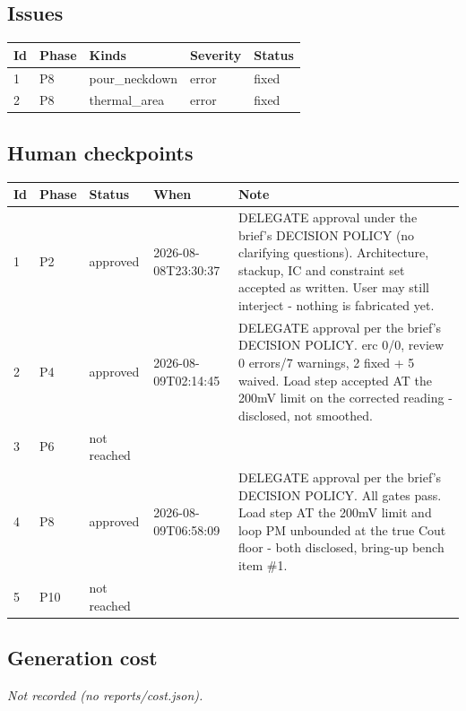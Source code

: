\documentclass[11pt,a4paper]{article}
\begin{document}
\subsection*{Issues}
{\small
\begin{longtable}{llp{5cm}ll}
\toprule
\textbf{Id} & \textbf{Phase} & \textbf{Kinds} & \textbf{Severity} & \textbf{Status} \\
\midrule
\endhead
1 & P8 & pour\_neckdown & error & fixed \\
2 & P8 & thermal\_area & error & fixed \\
\bottomrule
\end{longtable}
}
\subsection*{Human checkpoints}
{\small
\begin{longtable}{lllp{2.6cm}p{6.4cm}}
\toprule
\textbf{Id} & \textbf{Phase} & \textbf{Status} & \textbf{When} & \textbf{Note} \\
\midrule
\endhead
1 & P2 & approved & 2026-08-08T23:30:37 & DELEGATE approval under the brief's DECISION POLICY (no clarifying questions). Architecture, stackup, IC and constraint set accepted as written. User may still interject - nothing is fabricated yet. \\
2 & P4 & approved & 2026-08-09T02:14:45 & DELEGATE approval per the brief's DECISION POLICY. erc 0/0, review 0 errors/7 warnings, 2 fixed + 5 waived. Load step accepted AT the 200mV limit on the corrected reading - disclosed, not smoothed. \\
3 & P6 & not reached &  &  \\
4 & P8 & approved & 2026-08-09T06:58:09 & DELEGATE approval per the brief's DECISION POLICY. All gates pass. Load step AT the 200mV limit and loop PM unbounded at the true Cout floor - both disclosed, bring-up bench item \#1. \\
5 & P10 & not reached &  &  \\
\bottomrule
\end{longtable}
}
\subsection*{Generation cost}
\emph{Not recorded (no reports/cost.json).}
\end{document}
